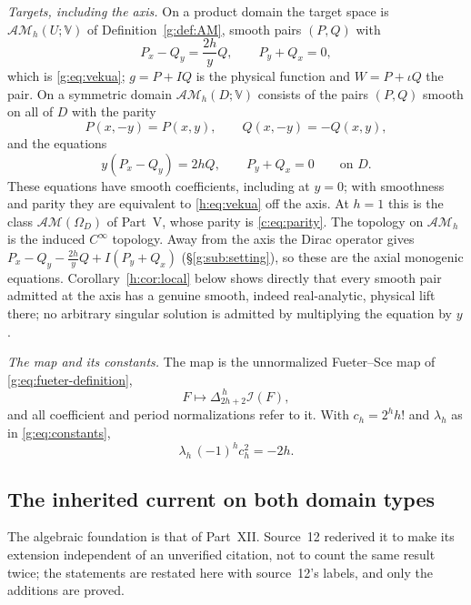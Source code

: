 \documentclass[11pt,a4paper]{article}
\numberwithin{equation}{section}
\theoremstyle{definition}
\theoremstyle{remark}
\theoremstyle{plain}
\newcommand{\I}{\mathcal I}
\newcommand{\AM}{\mathcal{AM}}
\newcommand{\Om}{\Omega}
\newcommand{\lapH}{\Delta_{2h+2}^{\,h}}
\newcommand{\VV}{\mathbb V}                       %
\begin{document}
\emph{Targets, including the axis.} On a product domain the target space is
$\AM_h(U;\VV)$ of Definition~\ref{g:def:AM}, smooth pairs $(P,Q)$ with
\begin{equation}\label{h:eq:vekua}
 P_x-Q_y=\frac{2h}{y}Q,\qquad P_y+Q_x=0,
\end{equation}
which is \eqref{g:eq:vekua}; $g=P+IQ$ is the physical function and
$W=P+\iota Q$ the pair. On a symmetric domain $\AM_h(D;\VV)$ consists of the
pairs $(P,Q)$ smooth on all of $D$ with the parity
\begin{equation}\label{h:eq:parity}
 P(x,-y)=P(x,y),\qquad Q(x,-y)=-Q(x,y),
\end{equation}
and the equations
\begin{equation}\label{h:eq:smooth-vekua}
 y(P_x-Q_y)=2hQ,\qquad P_y+Q_x=0\qquad\text{on }D.
\end{equation}
These equations have smooth coefficients, including at $y=0$; with smoothness
and parity they are equivalent to \eqref{h:eq:vekua} off the axis. At $h=1$
this is the class $\AM(\Om_D)$ of Part~V, whose parity is
\eqref{c:eq:parity}. The topology on $\AM_h$ is the induced $C^\infty$
topology. Away from the axis the Dirac operator gives
$P_x-Q_y-\tfrac{2h}yQ+I(P_y+Q_x)$ (\S\ref{g:sub:setting}), so these are the
axial monogenic equations. Corollary~\ref{h:cor:local} below shows directly
that every smooth pair admitted at the axis has a genuine smooth, indeed
real-analytic, physical lift there; no arbitrary singular solution is admitted
by multiplying the equation by $y$.

\emph{The map and its constants.} The map is the unnormalized Fueter--Sce map
of \eqref{g:eq:fueter-definition},
\begin{equation}\label{h:eq:Fu}
 F\longmapsto\lapH\I(F),
\end{equation}
and all coefficient and period normalizations refer to it. With $c_h=2^hh!$
and $\lambda_h$ as in \eqref{g:eq:constants},
\begin{equation}\label{h:eq:constants}
 \lambda_h\,(-1)^hc_h^2=-2h .
\end{equation}

\subsection{The inherited current on both domain types}
\label{h:sec:current}

The algebraic foundation is that of Part~XII. Source~12 rederived it to make
its extension independent of an unverified citation, not to count the same
result twice; the statements are restated here with source~12's labels, and
only the additions are proved.
\end{document}
